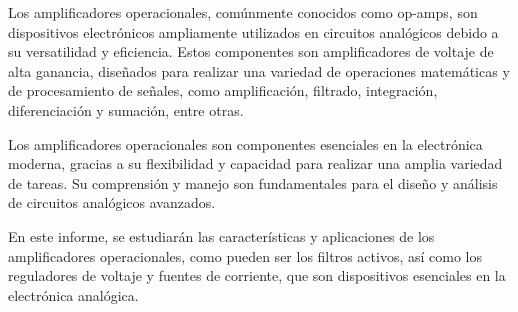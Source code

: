 Los amplificadores operacionales, comúnmente conocidos como op-amps, son dispositivos electrónicos ampliamente utilizados en circuitos analógicos debido a su versatilidad y eficiencia. Estos componentes son amplificadores de voltaje de alta ganancia, diseñados para realizar una variedad de operaciones matemáticas y de procesamiento de señales, como amplificación, filtrado, integración, diferenciación y sumación, entre otras.

Los amplificadores operacionales son componentes esenciales en la electrónica moderna, gracias a su flexibilidad y capacidad para realizar una amplia variedad de tareas. Su comprensión y manejo son fundamentales para el diseño y análisis de circuitos analógicos avanzados.

En este informe, se estudiarán las características y aplicaciones de los amplificadores operacionales, como pueden ser los filtros activos, así como los reguladores de voltaje y fuentes de corriente, que son dispositivos esenciales en la electrónica analógica.



